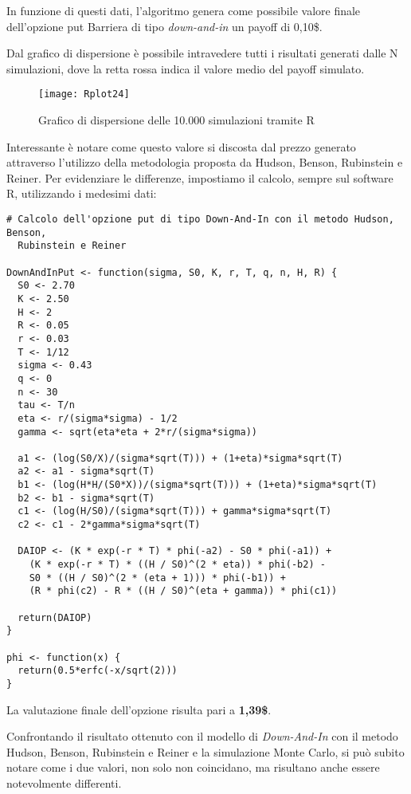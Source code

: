 \documentclass[12pt,a4paper]{report}
\begin{document}
In funzione di questi dati, l'algoritmo genera come possibile valore finale dell'opzione put Barriera di tipo \textit{down-and-in} un payoff di 0,10\$.

Dal grafico di dispersione è possibile intravedere tutti i risultati generati dalle N simulazioni, dove la retta rossa indica il valore medio del payoff simulato.

\begin{figure}
     [ht]
    \centering
    \texttt{[image: Rplot24]}
    \caption{Grafico di dispersione delle 10.000 simulazioni tramite R}
    \label{fig:enter-label112}
\end{figure}

Interessante è notare come questo valore si discosta dal prezzo generato attraverso l'utilizzo della metodologia proposta da Hudson, Benson, Rubinstein e Reiner. Per evidenziare le differenze, impostiamo il calcolo, sempre sul software R, utilizzando i medesimi dati:

\begin{verbatim}
# Calcolo dell'opzione put di tipo Down-And-In con il metodo Hudson, Benson,
  Rubinstein e Reiner
  
DownAndInPut <- function(sigma, S0, K, r, T, q, n, H, R) {
  S0 <- 2.70
  K <- 2.50
  H <- 2
  R <- 0.05
  r <- 0.03
  T <- 1/12
  sigma <- 0.43
  q <- 0
  n <- 30
  tau <- T/n
  eta <- r/(sigma*sigma) - 1/2
  gamma <- sqrt(eta*eta + 2*r/(sigma*sigma))
  
  a1 <- (log(S0/X)/(sigma*sqrt(T))) + (1+eta)*sigma*sqrt(T)
  a2 <- a1 - sigma*sqrt(T)
  b1 <- (log(H*H/(S0*X))/(sigma*sqrt(T))) + (1+eta)*sigma*sqrt(T)
  b2 <- b1 - sigma*sqrt(T)
  c1 <- (log(H/S0)/(sigma*sqrt(T))) + gamma*sigma*sqrt(T)
  c2 <- c1 - 2*gamma*sigma*sqrt(T)
  
  DAIOP <- (K * exp(-r * T) * phi(-a2) - S0 * phi(-a1)) +
    (K * exp(-r * T) * ((H / S0)^(2 * eta)) * phi(-b2) - 
    S0 * ((H / S0)^(2 * (eta + 1))) * phi(-b1)) +
    (R * phi(c2) - R * ((H / S0)^(eta + gamma)) * phi(c1))
 
  return(DAIOP)
}

phi <- function(x) {
  return(0.5*erfc(-x/sqrt(2)))
}
\end{verbatim}

La valutazione finale dell'opzione risulta pari a \textbf{1,39\$}. 


Confrontando il risultato ottenuto con il modello di \textit{Down-And-In} con il metodo Hudson, Benson, Rubinstein e Reiner e la simulazione Monte Carlo, si può subito notare come i due valori, non solo non coincidano, ma risultano anche essere notevolmente differenti.
\end{document}
